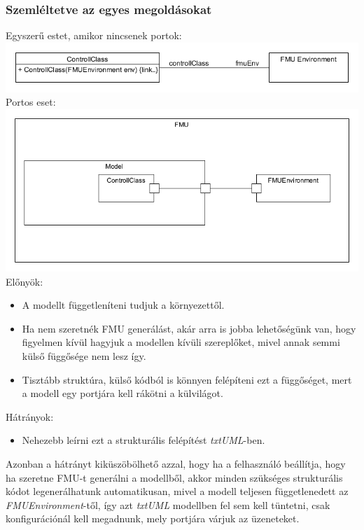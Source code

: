 \documentclass[a4paper,12pt]{report}
\begin{document}
\subsubsection{Szemléltetve az egyes megoldásokat}

Egyszerű estet, amikor nincsenek portok: \\
\includegraphics[scale=0.6]{fmu_simple.png} \\

Portos eset: \\
\includegraphics[scale=0.6]{fmu_with_ports.png} \\

Előnyök: \\
\begin{itemize}
\item A modellt függetleníteni tudjuk a környezettől.
\item Ha nem szeretnék FMU generálást, akár arra is jobba lehetőségünk van, hogy figyelmen kívül hagyjuk a modellen kívüli szereplőket, mivel annak semmi külső függősége nem lesz így.
\item Tisztább struktúra, külső kódból is könnyen felépíteni ezt a függőséget, mert a modell egy portjára kell rákötni a külvilágot.
\end{itemize}
Hátrányok: \\
\begin{itemize}
\item Nehezebb leírni ezt a strukturális felépítést \textit{txtUML}-ben.
\end{itemize}
Azonban a hátrányt kiküszöbölhető azzal, hogy ha a felhasználó beállítja, hogy ha szeretne FMU-t generálni a modellből, akkor minden szükséges strukturális kódot legenerálhatunk automatikusan, mivel a modell teljesen függetlenedett az \textit{FMUEnvironment}-től, így azt \textit{txtUML} modellben fel sem kell tüntetni, csak konfigurációnál kell megadnunk, mely portjára várjuk az üzeneteket.
\end{document}
